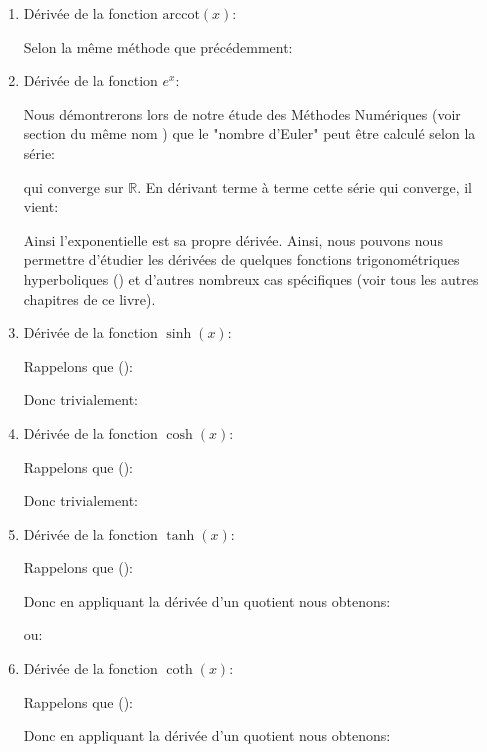 \begin{enumerate}
		 	
		 	\item Dérivée de la fonction $\text{arccot}(x)$:
		 	
		 	Selon la même méthode que précédemment:
		 	
		 	
		 	\item Dérivée de la fonction $e^x$:
		 	
		 	Nous démontrerons lors de notre étude des Méthodes Numériques (voir section du même nom \pageref{euler number computation}) que le "nombre d'Euler" peut être calculé selon la série:
		 	
		 	qui converge sur $\mathbb{R}$. En dérivant terme à terme cette série qui converge, il vient:
		 	
		 	Ainsi l'exponentielle est sa propre dérivée. Ainsi, nous pouvons nous permettre d'étudier les dérivées de quelques fonctions trigonométriques hyperboliques () et d'autres nombreux cas spécifiques (voir tous les autres chapitres de ce livre).
		 	
		 	\item Dérivée de la fonction $\sinh(x)$:
		 	
		 	Rappelons que ():
		 	
		 	Donc trivialement:
		 	
		 	
		 	\item Dérivée de la fonction $\cosh(x)$:
		 	
		 	Rappelons que ():
		 	
		 	Donc trivialement:
		 	
		 	
		 	\item Dérivée de la fonction $\tanh(x)$:
		 	
		 	Rappelons que ():
		 	
		 	Donc en appliquant la dérivée d'un quotient nous obtenons:
		 	
		 	ou:
		 	
		 	
		 	\item Dérivée de la fonction $\coth(x)$:
		 	
		 	Rappelons que ():
		 	
		 	Donc en appliquant la dérivée d'un quotient nous obtenons:
		 	

\end{enumerate}
